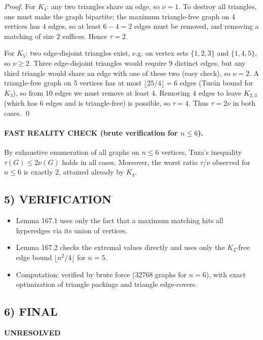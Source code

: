 \textit{Proof.}
For $K_4$: any two triangles share an edge, so $\nu=1$.
To destroy all triangles, one must make the graph bipartite; the maximum triangle-free graph on $4$ vertices has $4$ edges, so at least $6-4=2$ edges must be removed, and removing a matching of size $2$ suffices. Hence $\tau=2$.

For $K_5$: two edge-disjoint triangles exist, e.g. on vertex sets $\{1,2,3\}$ and $\{1,4,5\}$, so $\nu\ge 2$. Three edge-disjoint triangles would require $9$ distinct edges, but any third triangle would share an edge with one of these two (easy check), so $\nu=2$.
A triangle-free graph on $5$ vertices has at most $\lfloor 25/4\rfloor=6$ edges (Tur\'{a}n bound for $K_3$), so from $10$ edges we must remove at least $4$. Removing $4$ edges to leave $K_{2,3}$ (which has $6$ edges and is triangle-free) is possible, so $\tau=4$.
Thus $\tau=2\nu$ in both cases. \qed

\paragraph{FAST REALITY CHECK (brute verification for $n\le 6$).}
By exhaustive enumeration of all graphs on $n\le 6$ vertices, Tuza's inequality $\tau(G)\le 2\nu(G)$ holds in all cases.
Moreover, the worst ratio $\tau/\nu$ observed for $n\le 6$ is exactly $2$, attained already by $K_4$.

\subsection*{5) VERIFICATION}
\begin{itemize}
\item Lemma 167.1 uses only the fact that a maximum matching hits all hyperedges via its union of vertices.
\item Lemma 167.2 checks the extremal values directly and uses only the $K_3$-free edge bound $\lfloor n^2/4\rfloor$ for $n=5$.
\item Computation: verified by brute force (32768 graphs for $n=6$), with exact optimization of triangle packings and triangle edge-covers.
\end{itemize}

\subsection*{6) FINAL}
\textbf{UNRESOLVED}

